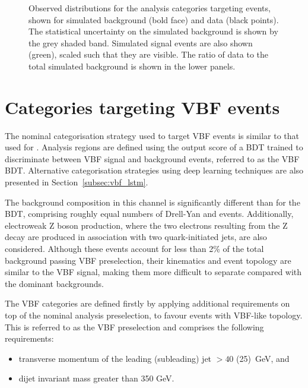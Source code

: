 \begin{figure}[htbp!]
\caption[The dielectron invariant mass distributions for analysis categories targeting \ggH events.]{Observed \mee distributions for the analysis categories targeting \ggH events, shown for simulated background (bold face) and data (black points). The statistical uncertainty on the simulated background is shown by the grey shaded band. Simulated \ggH signal events are also shown (green), scaled such that they are visible. The ratio of data to the total simulated background is shown in the lower panels.}
\label{fig:ggh_mee_dataMC}
\end{figure} 




\section{Categories targeting VBF events}
\label{subsec:vbf_categorisation}

The nominal categorisation strategy used to target VBF events is similar to that used for \ggH. Analysis regions are defined using the output score of a BDT trained to discriminate between VBF signal and background events, referred to as the VBF BDT. Alternative categorisation strategies using deep learning techniques are also presented in Section~\ref{subsec:vbf_lstm}. 

The background composition in this channel is significantly different than for the \ggH BDT, comprising roughly equal numbers of Drell-Yan and \ttbar events. 
Additionally, electroweak $\mathrm{Z}$ boson production, where the two electrons resulting from the $\mathrm{Z}$ decay are produced in association with two quark-initiated jets, are also considered. Although these events account for less than 2\% of the total background passing VBF preselection, their kinematics and event topology are similar to the VBF signal, making them more difficult to separate compared with the dominant backgrounds. 

The VBF categories are defined firstly by applying additional requirements on top of the nominal analysis preselection, to favour events with VBF-like topology. This is referred to as the VBF preselection and comprises the following requirements:

\begin{itemize}
    \item transverse momentum of the leading (subleading) jet $> 40$ (25)~GeV, and
    \item dijet invariant mass greater than 350 GeV.
\end{itemize}

